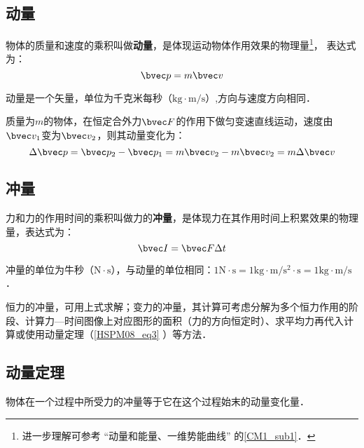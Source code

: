 
\begin{issues}
\issueDraft
\issueTODO
\end{issues}


\subsection{动量}

物体的质量和速度的乘积叫做\textbf{动量}，是体现运动物体作用效果的物理量\footnote{进一步理解可参考 “动量和能量、一维势能曲线” 的\autoref{CM1_sub1}．}， 表达式为：
\begin{equation}
\bvec p = m\bvec v
\end{equation}

动量是一个矢量，单位为千克米每秒（$\mathrm{kg\cdot m/s}$）,方向与速度方向相同．

质量为$m$的物体，在恒定合外力$\bvec F $的作用下做匀变速直线运动，速度由$\bvec v_1$变为$\bvec v_2$，则其动量变化为：
\begin{equation}\label{HSPM08_eq2}
\Delta \bvec p =\bvec p_2 - \bvec p_1 = m\bvec v_2 - m\bvec v_2 = m\Delta \bvec v
\end{equation}

\subsection{冲量}

力和力的作用时间的乘积叫做力的\textbf{冲量}，是体现力在其作用时间上积累效果的物理量，表达式为：
\begin{equation}
\bvec I=\bvec F \Delta t
\end{equation}

冲量的单位为牛秒（$\mathrm{N\cdot s}$），与动量的单位相同：$1\mathrm{N\cdot s}=1\mathrm{kg\cdot m/s^2 \cdot s}=1\mathrm{kg\cdot m/s}$．

恒力的冲量，可用上式求解；变力的冲量，其计算可考虑分解为多个恒力作用的阶段、计算力—时间图像上对应图形的面积（力的方向恒定时）、求平均力再代入计算或使用动量定理（\autoref{HSPM08_eq3}  ）等方法．

\subsection{动量定理}

物体在一个过程中所受力的冲量等于它在这个过程始末的动量变化量．

